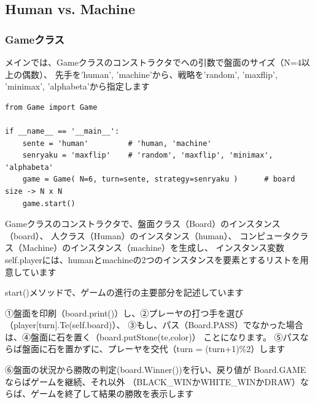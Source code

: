 \documentclass[uplatex,a4paper,11pt,oneside,openany]{jsbook}
\begin{document}
\newpage

\subsection{Human vs. Machine}

\subsubsection{Gameクラス}

メインでは、Gameクラスのコンストラクタでへの引数で盤面のサイズ（N=4以上の偶数）、
先手を'human', 'machine'から、戦略を'random', 'maxflip', 'minimax', 'alphabeta'から指定します

\begin{lstlisting}[caption=main,label=othello00]
from Game import Game

if __name__ == '__main__':
    sente = 'human'         # 'human, 'machine'
    senryaku = 'maxflip'    # 'random', 'maxflip', 'minimax', 'alphabeta'
    game = Game( N=6, turn=sente, strategy=senryaku )      # board size -> N x N
    game.start()
\end{lstlisting}

Gameクラスのコンストラクタで、盤面クラス（Board）のインスタンス（board）、
人クラス（Human）のインスタンス（human）、
コンピュータクラス（Machine）のインスタンス（machine）を生成し、
インスタンス変数self.playerには、humanとmachineの2つのインスタンスを要素とするリストを用意しています

start()メソッドで、ゲームの進行の主要部分を記述しています

①盤面を印刷（board.print()）し、②プレーヤの打つ手を選び（player[turn].Te(self.board)）、
③もし、パス（Board.PASS）でなかった場合は、④盤面に石を置く（board.putStone(te,color)）
ことになります。
⑤パスならば盤面に石を置かずに、プレーヤを交代（turn = (turn+1)\%2）します

⑥盤面の状況から勝敗の判定(board.Winner())を行い、戻り値が
Board.GAMEならばゲームを継続、それ以外
（BLACK\_WINかWHITE\_WINかDRAW）ならば、ゲームを終了して結果の勝敗を表示します
\end{document}
